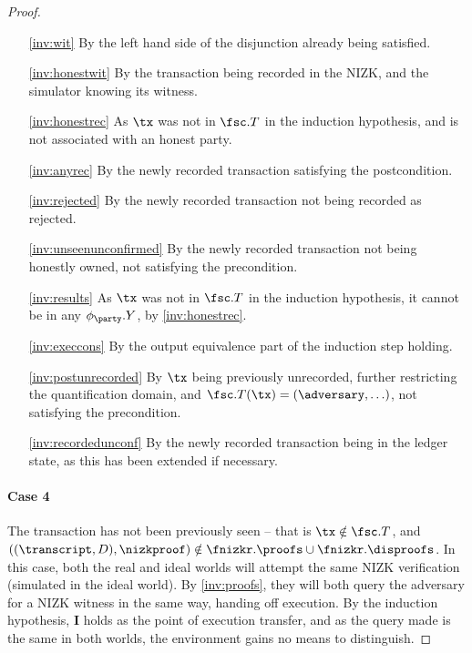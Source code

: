 \begin{proof}
  \begin{enumerate}
    \item[\ref{inv:wit}] By the left hand side of the disjunction already being
      satisfied.
    \item[\ref{inv:honestwit}] By the transaction being recorded in the NIZK,
      and the simulator knowing its witness.
    \item[\ref{inv:honestrec}] As $\tx$ was not in $\fsc.T$ in
      the induction hypothesis, and is not associated with an honest party.
    \item[\ref{inv:anyrec}] By the newly recorded transaction satisfying the
      postcondition.
    \item[\ref{inv:rejected}] By the newly recorded transaction not being
      recorded as rejected.
    \item[\ref{inv:unseenunconfirmed}] By the newly recorded transaction not
      being honestly owned, not satisfying the precondition.
    \item[\ref{inv:results}] As $\tx$ was not in $\fsc.T$ in the induction
      hypothesis, it cannot be in any $\phi_\party.Y$, by \ref{inv:honestrec}.
    \item[\ref{inv:execcons}] By the output equivalence part of the induction
      step holding.
    \item[\ref{inv:postunrecorded}] By $\tx$ being previously unrecorded,
      further restricting the quantification domain, and $\fsc.T(\tx) =
      (\adversary, \ldots)$, not satisfying the precondition.
    \item[\ref{inv:recordedunconf}] By the newly recorded transaction being in
      the ledger state, as this has been extended if necessary.
  \end{enumerate}

  \paragraph{Case 4} The transaction has not been previously seen -- that is
  $\tx \notin \fsc.T$, and $((\transcript, D), \nizkproof) \notin
  \fnizkr.\proofs \cup \fnizkr.\disproofs$. In this case, both the
  real and ideal worlds will attempt the same NIZK verification (simulated in
  the ideal world). By \ref{inv:proofs}, they will both query the adversary
  for a NIZK witness in the same way, handing off execution. By the induction
  hypothesis, $\boldsymbol I$ holds as the point of execution transfer, and as
  the query made is the same in both worlds, the environment gains no means to
  distinguish.


\end{proof}

